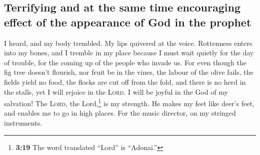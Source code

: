 \hypertarget{terrifying-and-at-the-same-time-encouraging-effect-of-the-appearance-of-god-in-the-prophet}{%
\subsection{Terrifying and at the same time encouraging effect of the
appearance of God in the
prophet}\label{terrifying-and-at-the-same-time-encouraging-effect-of-the-appearance-of-god-in-the-prophet}}

 I heard, and my body trembled. My lips quivered at the
voice. Rottenness enters into my bones, and I tremble in my place
because I must wait quietly for the day of trouble, for the coming up of
the people who invade us.  For even though the fig tree
doesn't flourish, nor fruit be in the vines, the labour of the olive
fails, the fields yield no food, the flocks are cut off from the fold,
and there is no herd in the stalls,  yet I will rejoice
in the \textsc{Lord}. I will be joyful in the God of my salvation!
 The \textsc{Lord}, the Lord,\footnote{\textbf{3:19} The
  word translated ``Lord'' is ``Adonai.''} is my strength. He makes my
feet like deer's feet, and enables me to go in high places. For the
music director, on my stringed instruments.
